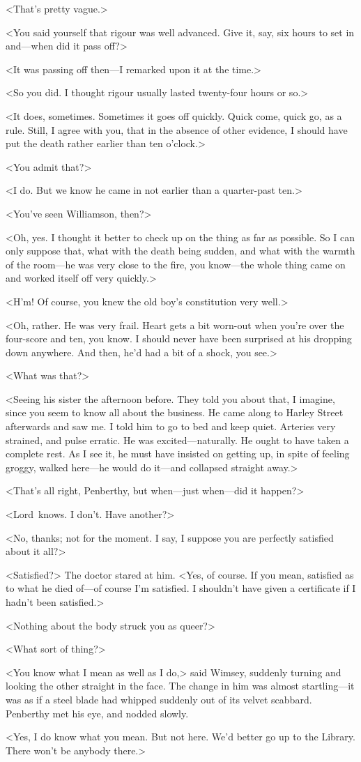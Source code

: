 <That's pretty vague.>

<You said yourself that rigour was well advanced. Give it, say, six hours to set in and—when did it pass off?>

<It was passing off then—I remarked upon it at the time.>

<So you did. I thought rigour usually lasted twenty-four hours or so.>

<It does, sometimes. Sometimes it goes off quickly. Quick come, quick go, as a rule. Still, I agree with you, that in the absence of other evidence, I should have put the death rather earlier than ten o'clock.>

<You admit that?>

<I do. But we know he came in not earlier than a quarter-past ten.>

<You've seen Williamson, then?>

<Oh, yes. I thought it better to check up on the thing as far as possible. So I can only suppose that, what with the death being sudden, and what with the warmth of the room—he was very close to the fire, you know—the whole thing came on and worked itself off very quickly.>

<H'm! Of course, you knew the old boy's constitution very well.>

<Oh, rather. He was very frail. Heart gets a bit worn-out when you're over the four-score and ten, you know. I should never have been surprised at his dropping down anywhere. And then, he'd had a bit of a shock, you see.>

<What was that?>

<Seeing his sister the afternoon before. They told you about that, I imagine, since you seem to know all about the business. He came along to Harley Street afterwards and saw me. I told him to go to bed and keep quiet. Arteries very strained, and pulse erratic. He was excited—naturally. He ought to have taken a complete rest. As I see it, he must have insisted on getting up, in spite of feeling groggy, walked here—he would do it—and collapsed straight away.>

<That's all right, Penberthy, but when—just when—did it happen?>

<Lord~knows. I don't. Have another?>

<No, thanks; not for the moment. I say, I suppose you are perfectly satisfied about it all?>

<Satisfied?> The doctor stared at him. <Yes, of course. If you mean, satisfied as to what he died of—of course I'm satisfied. I shouldn't have given a certificate if I hadn't been satisfied.>

<Nothing about the body struck you as queer?>

<What sort of thing?>

<You know what I mean as well as I do,> said Wimsey, suddenly turning and looking the other straight in the face. The change in him was almost startling—it was as if a steel blade had whipped suddenly out of its velvet scabbard. Penberthy met his eye, and nodded slowly.

<Yes, I do know what you mean. But not here. We'd better go up to the Library. There won't be anybody there.>